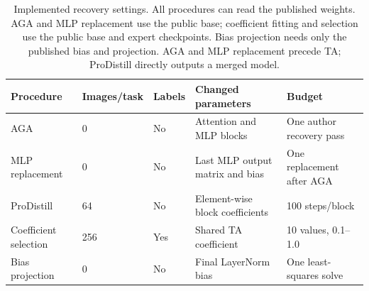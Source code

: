 \begin{table}[!t]
\centering
\small
\setlength{\tabcolsep}{3pt}
\caption{Implemented recovery settings. All procedures can read the published weights. AGA and MLP replacement use the public base; coefficient fitting and selection use the public base and expert checkpoints. Bias projection needs only the published bias and projection. AGA and MLP replacement precede TA; ProDistill directly outputs a merged model.}
\label{tab:recovery-access}
\begin{tabular}{lllp{5.2cm}l}
\toprule
Procedure & Images/task & Labels & Changed parameters & Budget \\
\midrule
AGA & 0 & No & Attention and MLP blocks & One author recovery pass \\
MLP replacement & 0 & No & Last MLP output matrix and bias & One replacement after AGA \\
ProDistill~\cite{xu2025prodistill} & 64 & No & Element-wise block coefficients & 100 steps/block \\
Coefficient selection & 256 & Yes & Shared TA coefficient & 10 values, 0.1--1.0 \\
Bias projection & 0 & No & Final LayerNorm bias & One least-squares solve \\
\bottomrule
\end{tabular}
\end{table}

